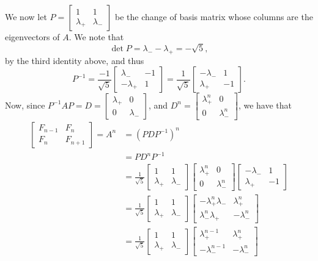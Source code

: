 \documentclass[letterpaper,12pt]{article}
\begin{document}
\begin{enumerate}
\begin{enumerate}
We now let $P=\begin{bmatrix}1&1\\\lambda_+&\lambda_-\end{bmatrix}$ be the change of basis matrix whose columns are the eigenvectors of $A$. We note that
\[
 \det P = \lambda_- - \lambda_+ = -\sqrt{5},
\]
by the third identity above, and thus
\[
 P^{-1} = \frac{-1}{\sqrt{5}}\begin{bmatrix}\lambda_-&-1\\-\lambda_+&1\end{bmatrix} = \frac{1}{\sqrt{5}}\begin{bmatrix}-\lambda_-&1\\\lambda_+&-1\end{bmatrix}.
\]
Now, since $P^{-1}AP = D = \begin{bmatrix}\lambda_+&0\\0&\lambda_-\end{bmatrix}$, and $D^n = \begin{bmatrix}\lambda_+^n&0\\0&\lambda_-^n\end{bmatrix}$, we have that
\begin{align*}
 \begin{bmatrix}F_{n-1}&F_n\\F_n&F_{n+1}\end{bmatrix} = A^n & = (PDP^{-1})^n\\
& = PD^nP^{-1}\\
& = \frac{1}{\sqrt{5}}\begin{bmatrix}1&1\\\lambda_+&\lambda_-\end{bmatrix}\begin{bmatrix}\lambda_+^n&0\\0&\lambda_-^n\end{bmatrix}\begin{bmatrix}-\lambda_-&1\\\lambda_+&-1\end{bmatrix}\\
& = \frac{1}{\sqrt{5}}\begin{bmatrix}1&1\\\lambda_+&\lambda_-\end{bmatrix}\begin{bmatrix}-\lambda_+^n\lambda_-&\lambda_+^n\\\lambda_-^n\lambda_+&-\lambda_-^n\end{bmatrix}\\
& = \frac{1}{\sqrt{5}}\begin{bmatrix}1&1\\\lambda_+&\lambda_-\end{bmatrix}\begin{bmatrix}\lambda_+^{n-1}&\lambda_+^n\\ -\lambda_-^{n-1}&-\lambda_-^n\end{bmatrix}\\

\end{align*}
\end{enumerate}
\end{enumerate}
\end{document}
